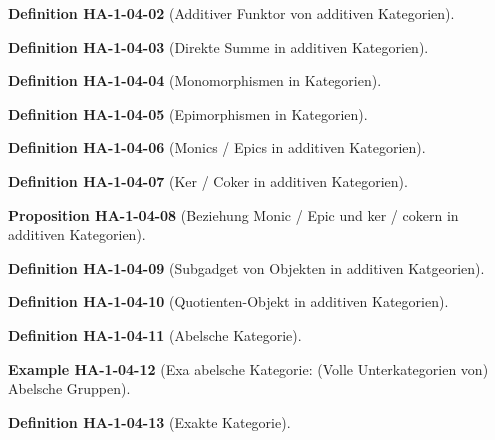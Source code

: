 \documentclass[10pt, letterpaper]{article}
\newcommand{\CustomHeading}[3]{%
  \par\medskip\noindent%
  \textbf{#1 #2} \textnormal{(#3)}.\enskip%
}
\newenvironment{DEF}[2]{\CustomHeading{Definition}{#1}{#2}}{}
\newenvironment{PROP}[2]{\CustomHeading{Proposition}{#1}{#2}}{}
\newenvironment{EXA}[2]{\CustomHeading{Example}{#1}{#2}}{}
\begin{document}
\begin{DEF}{HA-1-04-02}{Additiver Funktor von additiven Kategorien}
\end{DEF}

\begin{DEF}{HA-1-04-03}{Direkte Summe in additiven Kategorien}
\end{DEF}

\begin{DEF}{HA-1-04-04}{Monomorphismen in Kategorien}
\end{DEF}

\begin{DEF}{HA-1-04-05}{Epimorphismen in Kategorien}
\end{DEF}

\begin{DEF}{HA-1-04-06}{Monics / Epics in additiven Kategorien}
\end{DEF}

\begin{DEF}{HA-1-04-07}{Ker / Coker in additiven Kategorien}
\end{DEF}

\begin{PROP}{HA-1-04-08}{Beziehung Monic / Epic und ker / cokern in additiven Kategorien}
\end{PROP}

\begin{DEF}{HA-1-04-09}{Subgadget von Objekten in additiven Katgeorien}
\end{DEF}

\begin{DEF}{HA-1-04-10}{Quotienten-Objekt in additiven Kategorien}
\end{DEF}

\begin{DEF}{HA-1-04-11}{Abelsche Kategorie}
\end{DEF}

\begin{EXA}{HA-1-04-12}{Exa abelsche Kategorie: (Volle Unterkategorien von) Abelsche Gruppen}
\end{EXA}

\begin{DEF}{HA-1-04-13}{Exakte Kategorie}
\end{DEF}
\end{document}
